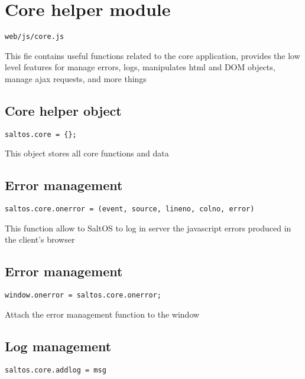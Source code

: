 \documentclass[a4paper]{book}
\begin{document}
\hypertarget{toc507}{}
\section{Core helper module}

\begin{lstlisting}
web/js/core.js
\end{lstlisting}

This fie contains useful functions related to the core application, provides the low level features
for manage errors, logs, manipulates html and DOM objects, manage ajax requests, and more things

\hypertarget{toc508}{}
\subsection{Core helper object}

\begin{lstlisting}
saltos.core = {};
\end{lstlisting}

This object stores all core functions and data

\hypertarget{toc509}{}
\subsection{Error management}

\begin{lstlisting}
saltos.core.onerror = (event, source, lineno, colno, error)
\end{lstlisting}

This function allow to SaltOS to log in server the javascript errors produced in the client's browser

\hypertarget{toc510}{}
\subsection{Error management}

\begin{lstlisting}
window.onerror = saltos.core.onerror;
\end{lstlisting}

Attach the error management function to the window

\hypertarget{toc511}{}
\subsection{Log management}

\begin{lstlisting}
saltos.core.addlog = msg
\end{lstlisting}
\end{document}
